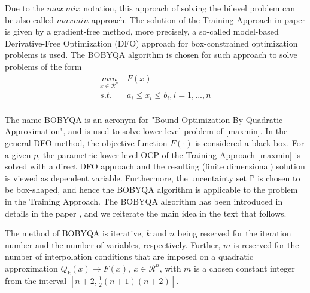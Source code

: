 \documentclass  [
  paper    = a4,
  BCOR     = 10mm,
  twoside,
  fontsize = 12pt,
  fleqn,
  toc      = bibnumbered,
  toc      = listofnumbered,
  numbers  = noendperiod,
  headings = normal,
  listof   = leveldown,
  version  = 3.03
]                                       {scrreprt}
\newcommand{\<}{\langle}
\renewcommand{\>}{\rangle}
\begin{document}
Due to the $max \ mix$ notation, this approach of solving the bilevel problem can be also called $max min$ approach. The solution of the Training Approach in paper \cite{MatSch22} is given by a gradient-free method, more precisely, a so-called model-based Derivative-Free Optimization (DFO) approach for box-constrained optimization problems is used. The BOBYQA algorithm is chosen for such approach to solve problems of the form
\begin{equation}
	\begin{aligned}
		\underset{x \in \mathcal{R}^n}{min} & \  F(x)  \\ 
		s.t.  & \ a_i \leq x_i \leq b_i, i = 1, ..., n \\
	\end{aligned}
	\label{DFO_bc}
\end{equation}

The name BOBYQA is an acronym for "Bound Optimization By Quadratic Approximation", and is used to solve lower level problem of \ref{maxmin}. In the general DFO method, the objective function $F(\cdot)$ is considered a black box. For a given $p$, the parametric lower level OCP of the Training Approach \ref{maxmin} is solved with a direct DFO approach and the resulting (finite dimensional) solution is viewed as dependent variable. Furthermore, the uncentainty set $\mathbb{P}$ is chosen to be box-shaped, and hence the BOBYQA algorithm is applicable to the problem in the Training Approach. The BOBYQA algorithm has been introduced in details in the paper \cite{MicPow09}, and we reiterate the main idea in the text that follows.  

The method of BOBYQA is iterative, $k$ and $n$ being reserved for the iteration number and the number of variables, respectively. Further, $m$ is reserved for the number of interpolation conditions that are imposed on a quadratic approximation $Q_k(x) \xrightarrow{} F(x), \ x \in  \mathcal{R}^n$, with $m$ is a chosen constant  integer from the interval $[n+2, \frac{1}{2}(n+1)(n+2)]$. 
\end{document}
